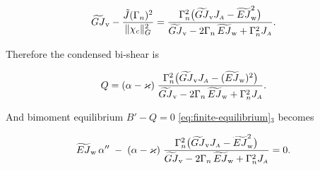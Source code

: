 \[
\GJv-\frac{\tilde{J}(\EnhanConstFA)^2}{\|\chi_c\|_G^2}
=\frac{\EnhanConstFA^2\big(\GJv\Ja-\EJw^2\big)}{\GJv-2\EnhanConstFA\,\EJw+\EnhanConstFA^2\Ja}.
\]

Therefore the condensed bi-shear is

\begin{equation}
Q= (\alpha-\Twist)\;
\frac{\EnhanConstFA^2\big(\GJv\Ja-(\EJw)^2\big)}{\GJv-2\EnhanConstFA\,\EJw+\EnhanConstFA^2\Ja}.
\label{eq:nonuniform-bishear}
\end{equation}

And bimoment equilibrium \(B'-Q=0\) \eqref{eq:finite-equilibrium}$_3$ becomes

\begin{equation}
\EJw\,\alpha''\;-\; (\alpha-\Twist)\;
\frac{\EnhanConstFA^2\big(\GJv\Ja-\EJw^2\big)}{\GJv-2\EnhanConstFA\,\EJw+\EnhanConstFA^2\Ja}=0.
\label{eq:bimoment-equilibrium}
\end{equation}


\fi 



%

